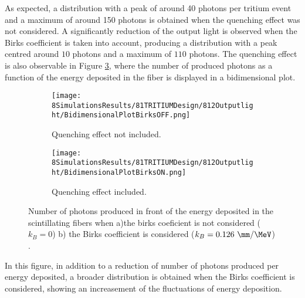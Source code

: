 As expected, a distribution with a peak of around 40 photons per tritium event and a maximum of around 150 photons is obtained when the quenching effect was not considered. A significantly reduction of the output light is observed when the Birks coefficient is taken into account, producing a distribution with a peak centred around $10$ photons and a maximum of $110$ photons. The quenching effect is also observable in Figure \ref{fig:2DimPlotBirks}, where the number of produced photons as a function of the energy deposited in the fiber is displayed in a bidimensional plot.

\begin{figure}
\centering
    \begin{subfigure}[b]{0.4\textwidth}
    \centering
    \texttt{[image: 8SimulationsResults/81TRITIUMDesign/812Outputlight/BidimensionalPlotBirksOFF.png]}  
    \caption{Quenching effect not included.\label{subfig:2DimPlotNoBirks}}
    \end{subfigure}
    \hfill
    \begin{subfigure}[b]{0.4\textwidth}
    \centering
    \texttt{[image: 8SimulationsResults/81TRITIUMDesign/812Outputlight/BidimensionalPlotBirksON.png]}  
    \caption{Quenching effect included.\label{subfig:2DimPlotBirks}}
    \end{subfigure}
 \caption{Number of photons produced in front of the energy deposited in the scintillating fibers when a)the birks coeficient is not considered ($k_B=0$) b) the Birks coefficient is considered ($k_B=0.126~\mm/\MeV$) \cite{SimulationPaperCarlos}.}
 \label{fig:2DimPlotBirks}
\end{figure}

In this figure, in addition to a reduction of number of photons produced per energy deposited, a broader distribution is obtained when the Birks coefficient is considered, showing an increasement of the fluctuations of energy deposition.